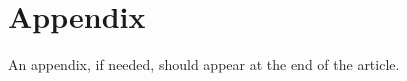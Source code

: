 \documentclass[twocolumn]{layout/tudelft-aiaa}
\begin{document}

\renewcommand{\bibpreamble}{For a full documentation of the references, please refer to the sample.bib file. You can delete this text/command safely in main.tex at line 63. \cite{example-article,example-article-published-online,example-inbook,example-inbook-series-with-editor,example-inproceedings,example-proceedings,example-report,example-paper,example-phdthesis}}




\section*{Appendix}

An appendix, if needed, should appear at the end of the article.
\end{document}
